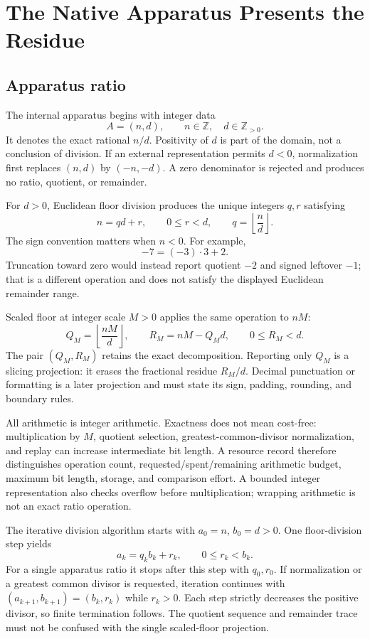 \chapter{The Native Apparatus Presents the Residue}

\section{Apparatus ratio}

The internal apparatus begins with integer data
\[
                         A=(n,d),\qquad n\in\mathbb Z,\quad d\in\mathbb Z_{>0}.
\]
It denotes the exact rational \(n/d\).  Positivity of \(d\) is part of the domain, not a conclusion of division.
If an external representation permits \(d<0\), normalization first replaces \((n,d)\) by \((-n,-d)\).  A zero
denominator is rejected and produces no ratio, quotient, or remainder.

For \(d>0\), Euclidean floor division produces the unique integers \(q,r\) satisfying
\[
                         n=qd+r,\qquad 0\leq r<d,
\qquad q=\left\lfloor\frac nd\right\rfloor.
\]
The sign convention matters when \(n<0\).  For example,
\[
                         -7=(-3)\cdot3+2.
\]
Truncation toward zero would instead report quotient \(-2\) and signed leftover \(-1\); that is a different
operation and does not satisfy the displayed Euclidean remainder range.

Scaled floor at integer scale \(M>0\) applies the same operation to \(nM\):
\[
 Q_M=\left\lfloor\frac{nM}{d}\right\rfloor,\qquad
 R_M=nM-Q_Md,\qquad 0\leq R_M<d.
\]
The pair \((Q_M,R_M)\) retains the exact decomposition.  Reporting only \(Q_M\) is a slicing projection: it erases
the fractional residue \(R_M/d\).  Decimal punctuation or formatting is a later projection and must state its sign,
padding, rounding, and boundary rules.

All arithmetic is integer arithmetic.  Exactness does not mean cost-free: multiplication by \(M\), quotient
selection, greatest-common-divisor normalization, and replay can increase intermediate bit length.  A resource
record therefore distinguishes operation count, requested/spent/remaining arithmetic budget, maximum bit length,
storage, and comparison effort.  A bounded integer representation also checks overflow before multiplication;
wrapping arithmetic is not an exact ratio operation.

The iterative division algorithm starts with \(a_0=n\), \(b_0=d>0\).  One floor-division step yields
\[
                         a_k=q_kb_k+r_k,\qquad0\leq r_k<b_k.
\]
For a single apparatus ratio it stops after this step with \(q_0,r_0\).  If normalization or a greatest common divisor
is requested, iteration continues with \((a_{k+1},b_{k+1})=(b_k,r_k)\) while \(r_k>0\).  Each step strictly decreases
the positive divisor, so finite termination follows.  The quotient sequence and remainder trace must not be confused
with the single scaled-floor projection.

